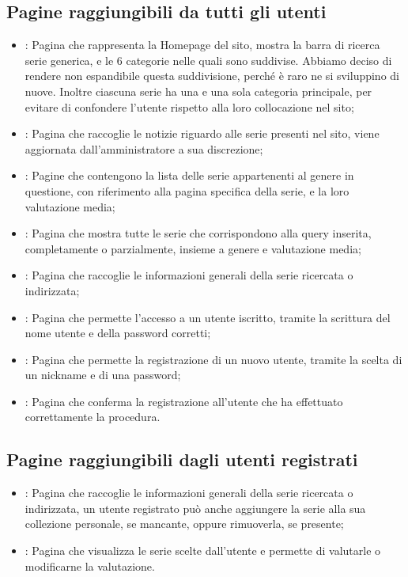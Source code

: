 \documentclass{tecweb}
\begin{document}
	\subsection{Pagine raggiungibili da tutti gli utenti}
	\begin{itemize}
		\item {}: Pagina che rappresenta la Homepage del sito, mostra la barra di ricerca serie generica, e le 6 categorie nelle quali sono suddivise. Abbiamo deciso di rendere non espandibile questa suddivisione, perché è raro ne si sviluppino di nuove.
		Inoltre ciascuna serie ha una e una sola categoria principale, per evitare di confondere l'utente rispetto alla loro collocazione nel sito;
		\item {}: Pagina che raccoglie le notizie riguardo alle serie presenti nel sito, viene aggiornata dall'amministratore a sua discrezione;
		\item {}: Pagine che contengono la lista delle serie appartenenti al genere in questione, con riferimento alla pagina specifica della serie, e la loro valutazione media;
		\item {}: Pagina che mostra tutte le serie che corrispondono alla query inserita, completamente o parzialmente, insieme a genere e valutazione media;
		\item {}: Pagina che raccoglie le informazioni generali della serie ricercata o indirizzata;
		\item {}: Pagina che permette l'accesso a un utente iscritto, tramite la scrittura del nome utente e della password corretti;
		\item {}: Pagina che permette la registrazione di un nuovo utente, tramite la scelta di un nickname e di una password;
		\item {}: Pagina che conferma la registrazione all'utente che ha effettuato correttamente la procedura.
	\end{itemize}
	\subsection{Pagine raggiungibili dagli utenti registrati}
	\begin{itemize}
		\item {}: Pagina che raccoglie le informazioni generali della serie ricercata o indirizzata, un utente registrato può anche aggiungere la serie alla sua collezione personale, se mancante, oppure rimuoverla, se presente;
		\item {}: Pagina che visualizza le serie scelte dall'utente e permette di valutarle o modificarne la valutazione.
	\end{itemize}
\end{document}
